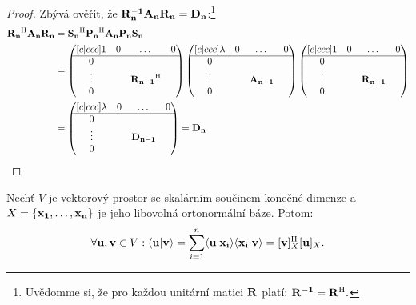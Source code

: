 \begin{proof}
    Zbývá ověřit, že $\mathbf{R_n^{-1}} \mathbf{A_n} \mathbf{R_n} = \mathbf{D_n}$:\footnote{Uvědomme 
        si, že pro každou unitární matici $\mathbf{R}$ platí: 
    $\mathbf{R^{-1}} = \mathbf{R}^{\mathrm{H}}.$}
    \begin{align*}
        \mathbf{R_n}^{\mathrm{H}} \mathbf{A_n} \mathbf{R_n} 
        &= \mathbf{S_n}^{\mathrm{H}} \mathbf{P_n}^{\mathrm{H}} \mathbf{A_n} \mathbf{P_n} \mathbf{S_n} \\
        &= \begin{pmatrix}[c|ccc]
            1 &0 &\dots &0 \\
            \hline
            0 & & &\\
            \vdots & &\mathbf{R_{n-1}}^{\mathrm{H}} & \\
                 0 & & &
        \end{pmatrix}
        \begin{pmatrix}[c|ccc]
            \lambda &0 &\dots &0 \\
            \hline
            0 & & &\\
            \vdots & &\mathbf{A_{n-1}} & \\
                 0 & & &
        \end{pmatrix}
        \begin{pmatrix}[c|ccc]
            1 &0 &\dots &0 \\
            \hline
            0 & & &\\
            \vdots & &\mathbf{R_{n-1}} & \\
                 0 & & &
        \end{pmatrix} \\
        &=
        \begin{pmatrix}[c|ccc]
            \lambda &0 &\dots &0 \\
            \hline
            0 & & &\\
            \vdots & &\mathbf{D_{n-1}} & \\
                 0 & & &
        \end{pmatrix}
        =
        \mathbf{D_n}
    \end{align*}
\end{proof}

\begin{observation}
    \label{obs:scpuv=vhu}
    Nechť $V$ je vektorový prostor se skalárním součinem konečné dimenze
    a $X=\{\mathbf{x_1}, \dots, \mathbf{x_n}\}$ je jeho libovolná ortonormální báze. 
    Potom: $$\forall \mathbf{u}, \mathbf{v} \in V: \langle \mathbf{u} | \mathbf{v} \rangle = \sum_{i=1}^n
    \langle \mathbf{u} | \mathbf{x_i} \rangle\langle \mathbf{x_i} | \mathbf{v} \rangle = [\mathbf{v}]_X^{\mathrm{H}}[\mathbf{u}]_X.$$
\end{observation}

